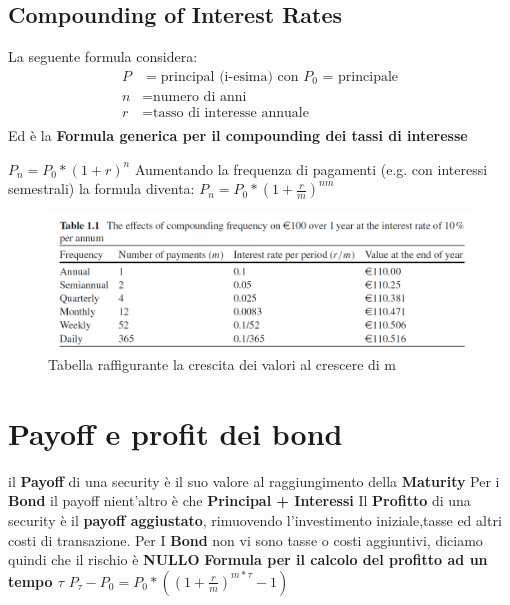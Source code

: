 \documentclass[a4paper,11pt]{report}
\begin{document}
{%
\subsection{Compounding of Interest Rates}
La seguente formula considera: 
\begin{align*}
P &= \text{principal (i-esima) con $P_0$ = principale} \\
n &= \text{numero di anni}\\
r &= \text{tasso di interesse annuale}\\
\end{align*}
Ed è la \textbf{Formula generica per il compounding dei tassi di interesse} 
\begin{center}
 $P_n=P_0*(1+r)^n$  \newline
Aumentando la frequenza di pagamenti (e.g. con interessi semestrali) la formula diventa: \newline
 $P_n=P_0*(1+{\frac {r}{m}})^{nm} $ \newline
\end{center}
\begin{figure}[h!]
\includegraphics[width=\linewidth]{TableInterests.png}
\caption {Tabella raffigurante la crescita dei valori al crescere di m}
\end{figure}

\newpage
\section {Payoff e profit dei bond}
il \textbf{Payoff} di una security è il suo valore al raggiungimento della  \textbf{Maturity } 
Per i \textbf{Bond} il payoff nient'altro è che \textbf{Principal + Interessi} \newline
Il \textbf{Profitto} di una security è il \textbf{payoff aggiustato}, rimuovendo l'investimento iniziale,tasse ed altri costi di transazione. \newline
Per I \textbf{Bond} non vi sono tasse o costi aggiuntivi, diciamo quindi che il rischio è \textbf{NULLO}
\newline \textbf{Formula per il calcolo del profitto ad un tempo $\tau$} \newline
{\LARGE {$P_\tau - P_0 = P_0*((1+{\frac {r}{m}})^{m*\tau}-1)$}}
}
\end{document}
